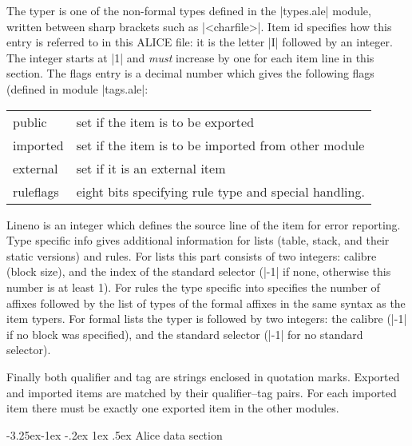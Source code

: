 \documentclass[titlepage]{article}
\makeatletter
\newcommand\I{\textsf{ALICE}}
\newcommand\g[1]{\textsf{\color{blue!90!black}#1}}
\renewcommand\subsection{%
\@startsection{subsection}{2}{\z@}%
   {-3.25ex\@plus -1ex \@minus -.2ex}%
   {1ex \@plus .5ex}%
   {\normalfont\normalsize\bfseries}}
\makeatother
\begin{document}
\noindent
The \g{typer} is one of the non-formal types defined in the \pp|types.ale|
module, written between sharp brackets such as \pp|<charfile>|. \g{Item id}
specifies how this entry is referred to in this \I{} file: it is 
the letter \pp|I| followed by an integer. The integer starts at \pp|1| and
\emph{must} increase by one for each item line in this section.
%
The \g{flags} entry is a decimal number which gives the following flags
(defined in module \pp|tags.ale|:
\begin{center}\begin{tabular}{ll}
\g{public} & set if the item is to be exported \\
\g{imported}& set if the item is to be imported from other module \\
\g{external}& set if it is an external item \\
\g{ruleflags}& eight bits specifying rule type and special handling.
\end{tabular}\end{center}

\g{Lineno} is an integer which defines the source line of the item for error
reporting. \g{Type specific info} gives additional information for lists
(\g{table}, \g{stack}, and their static versions) and \g{rule}s. For lists this
part consists of two integers: calibre (block size), and the index of the
standard selector (\pp|-1| if none, otherwise this number is at least 1).
For rules the \g{type specific into} specifies the number of affixes
followed by the list of types of the formal affixes in the same syntax as
the item \g{typer}s. For formal lists the typer is followed by two integers:
the calibre (\pp|-1| if no block was specified), and the standard selector
(\pp|-1| for no standard selector).

Finally both \g{qualifier} and \g{tag} are strings enclosed in quotation
marks. Exported and imported items are matched by their qualifier--tag
pairs. For each imported item there must be exactly one exported item in the
other modules.

\subsection{Alice data section}\label{alice:data}
\end{document}
